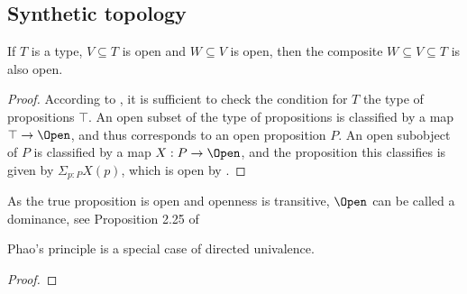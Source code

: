 \subsection{Synthetic topology}

\begin{lemma}
  If $T$ is a type, $V\subseteq T$ is open and 
  $W\subseteq V$ is open, then the composite $W\subseteq V\subseteq T$ is also open.
\end{lemma}
\begin{proof}
  According to \cite{SyntheticTopologyLesnik, p41}, 
  it is sufficient to check the condition for $T$ the type of propositions $\top$.
  An open subset of the type of propositions is classified by a map $\top \to \Open$, 
  and thus corresponds to an open proposition $P$. 
  An open subobject of $P$ is classified by a map $X:P\to \Open$, 
  and the proposition this classifies is given by $\Sigma_{p:P}X(p)$, 
  which is open by .
\end{proof}

\begin{remark}
  As the true proposition is open and openness is transitive, 
  $\Open$ can be called a dominance, see Proposition 2.25 of \cite{SyntheticTopologyLesnik}
\end{remark}

\begin{remark}
  Phao's principle is a special case of directed univalence. 
\end{remark}
\begin{proof}
\end{proof}
